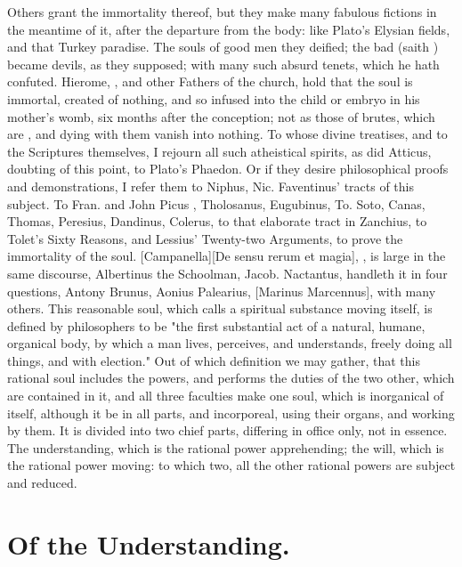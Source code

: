 Others grant the immortality thereof, but they make many fabulous fictions in
the meantime of it, after the departure from the body: like Plato's Elysian
fields, and that Turkey paradise. The souls of good men they deified; the bad
(saith \Austin{}) became devils, as they supposed; with many
such absurd tenets, which he hath confuted. Hierome, \Austin{}, and other Fathers
of the church, hold that the soul is immortal, created of nothing, and so
infused into the child or embryo in his mother's womb, six months after the
conception; not as those of brutes, which are , and dying with them vanish into nothing. To whose divine treatises,
and to the Scriptures themselves, I rejourn all such atheistical spirits, as
\Tully{} did Atticus, doubting of this point, to Plato's Phaedon. Or if they
desire philosophical proofs and demonstrations, I refer them to Niphus, Nic.
Faventinus' tracts of this subject. To Fran. and John Picus
, Tholosanus, Eugubinus, To.
Soto, Canas, Thomas, Peresius, Dandinus, Colerus, to that elaborate tract in
Zanchius, to Tolet's Sixty Reasons, and Lessius' Twenty-two Arguments, to prove
the immortality of the soul. [Campanella][\textlatin{De
sensu rerum et magia}], , is large in
the same discourse, Albertinus the Schoolman, Jacob. Nactantus,
 handleth it in four questions, Antony
Brunus, Aonius Palearius, [Marinus Marcennus], with many
others. This reasonable soul, which \Austin{} calls a spiritual substance moving
itself, is defined by philosophers to be "the first substantial act of a
natural, humane, organical body, by which a man lives, perceives, and
understands, freely doing all things, and with election." Out of which
definition we may gather, that this rational soul includes the powers, and
performs the duties of the two other, which are contained in it, and all three
faculties make one soul, which is inorganical of itself, although it be in all
parts, and incorporeal, using their organs, and working by them. It is divided
into two chief parts, differing in office only, not in essence. The
understanding, which is the rational power apprehending; the will, which is the
rational power moving: to which two, all the other rational powers are subject
and reduced.

\section{Of the Understanding.}

